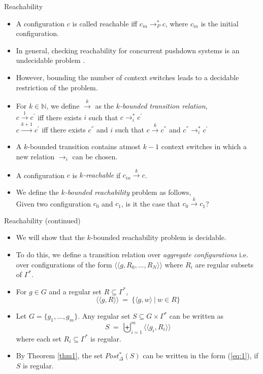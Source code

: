 \documentclass[10pt,notheorems]{beamer}
\theoremstyle{plain} %
\begin{document}
\begin{frame}{Reachability}
    \begin{itemize}
        \item A configuration $c$ is called reachable iff $c_{in}\rightarrow_P^* c$, where $c_{in}$ is the 
        initial configuration.
        \item In general, checking reachability for concurrent pushdown systems is an undecidable problem \cite{ramalingam2000context}.
        \item However, bounding the number of context switches leads to a decidable restriction of the problem.
        \item For $k\in \mathbb{N}$, we define $\xrightarrow{k}$ as the \textit{$k$-bounded transition relation},\\
        $c\xrightarrow{1} c^{\prime}$ iff there exists $i$ such that $c\rightarrow_i^* c^{\prime}$\\
        $c\xrightarrow{k+1} c^{\prime}$ iff there exists $c^{''}$ and $i$ such that $c\xrightarrow{k}c^{''}$ and $c^{''}\rightarrow_i^* c^{\prime}$
        \item A $k$-bounded transition contains atmost $k-1$ context switches in which a new 
        relation $\rightarrow_i$ can be chosen.
        \item A configuration $c$ is \textit{$k$-reachable} if $c_{in}\xrightarrow{k} c$. 
        \item We define the \textit{$k$-bounded reachability} problem as follows,\\
        Given two configuration $c_0$ and $c_1$, is it the case that $c_0\xrightarrow{k} c_1$?
    \end{itemize}
\end{frame}
\begin{frame}{Reachability (continued)}
    \begin{itemize}
        \item We will show that the $k$-bounded reachability problem is decidable.
        \item To do this, we define a transition relation over \textit{aggregate configurations} i.e. 
        over configurations of the form $\langle\langle g,R_0,\dots, R_N\rangle\rangle$ where $R_i$ are regular subsets 
        of $\Gamma^*$.
        \item For $g\in G$ and a regular set $R\subseteq \Gamma^*$,
        \[\langle\langle g,R\rangle\rangle\:=\:\{\langle g,w\rangle\:|\:w\in R\}\]
        \item Let $G=\{g_1,\dots,g_m\}$. Any regular set $S\subseteq G\times \Gamma^*$ can be written as 
        \begin{equation}\label{eq:1} S\:=\:\biguplus_{i=1}^{m}\langle\langle g_i,R_i\rangle\rangle\end{equation}
        where each set $R_i\subseteq \Gamma^*$ is regular.
        \item By Theorem \ref{thm1}, the set $Post^*_{\Delta}(S)$ can be written in the form (\ref{eq:1}), if $S$ is regular.  
    \end{itemize}
\end{frame}
\end{document}
